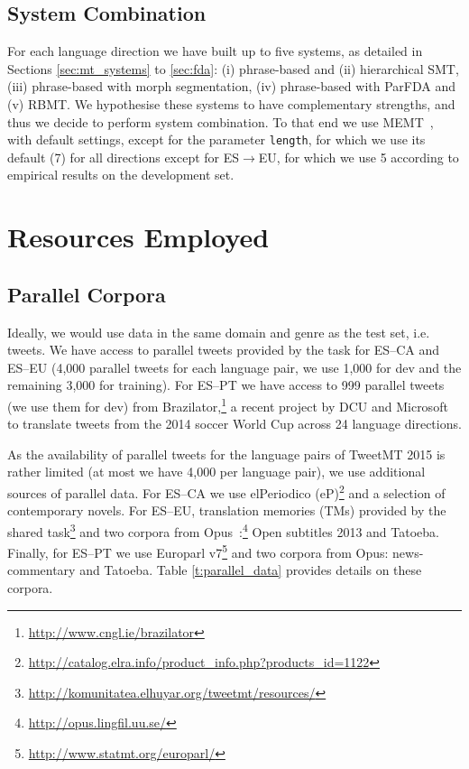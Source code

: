 \documentclass[postprint]{flammie}
\begin{document}
\subsection{System Combination}\label{sec:sys_combo}

For each language direction we have built up to five systems, as detailed in Sections \ref{sec:mt_systems} to \ref{sec:fda}:
(i) phrase-based and (ii) hierarchical SMT, (iii) phrase-based with morph segmentation, (iv) phrase-based with ParFDA and (v) RBMT.
We hypothesise these systems to have complementary strengths, and thus we decide to perform system combination.
To that end we use MEMT~\cite{heafield2010combining}, with default settings, except for the parameter \texttt{length}, for which we use its default (7) for all directions except for ES$\rightarrow$EU, for which we use 5 according to empirical results on the development set.



\section{Resources Employed}
\label{sec:resources}

\subsection{Parallel Corpora}\label{ss:parallel_corpora}

Ideally, we would use data in the same domain and genre as the test set, i.e. tweets.
We have access to parallel tweets provided by the task for ES--CA and ES--EU (4,000 parallel tweets for each language pair, we use 1,000 for dev and the remaining 3,000 for training).
For ES--PT we have access to 999 parallel tweets (we use them for dev) from Brazilator,\footnote{\url{http://www.cngl.ie/brazilator}} a recent project by DCU and Microsoft to translate tweets from the 2014 soccer World Cup across 24 language directions.

As the availability of parallel tweets for the language pairs of TweetMT 2015 is rather limited (at most we have 4,000 per language pair), we use additional sources of parallel data.
For ES--CA we use elPeriodico (eP)\footnote{\url{http://catalog.elra.info/product_info.php?products_id=1122}} and a selection of contemporary novels.
For ES--EU, translation memories (TMs) provided by the shared task\footnote{\url{http://komunitatea.elhuyar.org/tweetmt/resources/}}
and two corpora from Opus~\cite{TIEDEMANN12.463}:\footnote{\url{http://opus.lingfil.uu.se/}} Open subtitles 2013 and Tatoeba.
Finally, for ES--PT we use Europarl v7\footnote{\url{http://www.statmt.org/europarl/}} and two corpora from Opus: news-commentary and Tatoeba.
Table \ref{t:parallel_data} provides details on these corpora.
\end{document}
